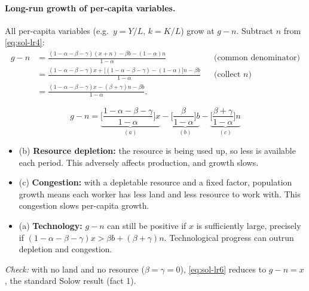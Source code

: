 \paragraph{Long-run growth of per-capita variables.} All per-capita variables (e.g.\ $y=Y/L$, $k=K/L$) grow at $g-n$. Subtract $n$ from \eqref{eq:sol-lr4}:
\begin{align*}
g-n&=\frac{(1-\alpha-\beta-\gamma)(x+n)-\beta b-(1-\alpha)n}{1-\alpha} && \text{(common denominator)}\\
&=\frac{(1-\alpha-\beta-\gamma)x+\big[(1-\alpha-\beta-\gamma)-(1-\alpha)\big]n-\beta b}{1-\alpha} && \text{(collect $n$)}\\
&=\frac{(1-\alpha-\beta-\gamma)x-(\beta+\gamma)n-\beta b}{1-\alpha} .
\end{align*}
\begin{keybox}[title=Long-run per-capita growth with land and resources]
\begin{equation}\label{eq:sol-lr6}
g-n=\underbrace{\Big[\frac{1-\alpha-\beta-\gamma}{1-\alpha}\Big]x}_{(a)}-\underbrace{\Big[\frac{\beta}{1-\alpha}\Big]b}_{(b)}-\underbrace{\Big[\frac{\beta+\gamma}{1-\alpha}\Big]n}_{(c)}
\end{equation}
\begin{itemize}
  \item (b) \textbf{Resource depletion:} the resource is being used up, so less is available each period. This adversely affects production, and growth slows.
  \item (c) \textbf{Congestion:} with a depletable resource and a fixed factor, population growth means each worker has less land and less resource to work with. This congestion slows per-capita growth.
  \item (a) \textbf{Technology:} $g-n$ can still be positive if $x$ is sufficiently large, precisely if $(1-\alpha-\beta-\gamma)x>\beta b+(\beta+\gamma)n$. Technological progress can outrun depletion and congestion.
\end{itemize}
\end{keybox}
\textit{Check:} with no land and no resource ($\beta=\gamma=0$), \eqref{eq:sol-lr6} reduces to $g-n=x$, the standard Solow result (fact 1).
